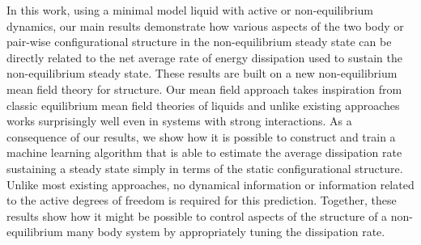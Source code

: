 \documentclass[superscriptaddress, twocolumn, prl, longbibliography, nofootinbib]{revtex4-1}
\begin{document}
In this work, using a minimal model liquid with active or non-equilibrium dynamics, our main results demonstrate how various aspects of the two body or pair-wise configurational structure in the non-equilibrium steady state can be directly related to the net average rate of energy dissipation used to sustain the non-equilibrium steady state. These results are built on a new non-equilibrium mean field theory for structure. Our mean field approach takes inspiration from classic equilibrium mean field theories of liquids and unlike existing approaches works surprisingly well even in systems with strong interactions. As a consequence of our results, we show how it is possible to construct and train a machine learning algorithm that is able to estimate the average dissipation rate sustaining a steady state simply in terms of the static configurational structure. Unlike most existing approaches, no dynamical information or information related to the active degrees of freedom is required for this prediction. Together, these results show how it might be possible to control aspects of the structure of a non-equilibrium many body system by appropriately tuning the dissipation rate. 




\end{document}
